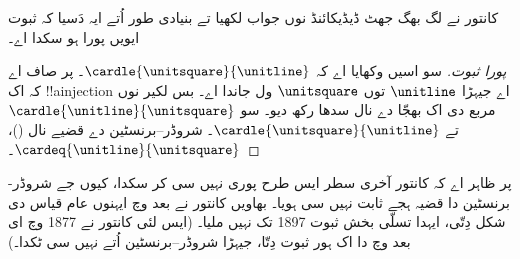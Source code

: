 \documentclass[../../../include/open-logic-section]{subfiles}
\begin{document}
کانتور نے لگ بھگ جھٹ ڈیڈیکائنڈ نوں جواب لکھیا تے بنیادی طور اُتے ایہ دَسیا کہ ثبوت ایویں پورا ہو سکدا اے۔

\begin{proof}[پورا ثبوت]
سو اسیں وکھایا اے کہ $\cardle{\unitsquare}{\unitline}$۔ پر صاف اے کہ اک !!a{injection} اے جیہڑا $\unitline$ توں $\unitsquare$ ول جاندا اے۔ بس لکیر نوں مربع دی اک بھجّا دے نال سدھا رکھ دیو۔ سو $\cardle{\unitline}{\unitsquare}$ تے $\cardle{\unitsquare}{\unitline}$۔ شروڈر--برنسٹین دے قضیے نال
()،
$\cardeq{\unitline}{\unitsquare}$۔
\end{proof}

پر ظاہر اے کہ کانتور آخری سطر ایس طرح پوری نہیں سی کر سکدا، کیوں جے شروڈر-برنسٹین دا قضیہ ہجے ثابت نہیں سی ہویا۔ بھاویں کانتور نے بعد وچ ایہنوں عام قیاس دی شکل دِتّی، ایہدا تسلّی بخش ثبوت 1897 تک نہیں ملیا۔ (ایس لئی کانتور نے 1877 وچ ای بعد وچ  دا اک ہور ثبوت دِتّا، جیہڑا شروڈر--برنسٹین اُتے نہیں سی ٹکدا۔)
\end{document}
